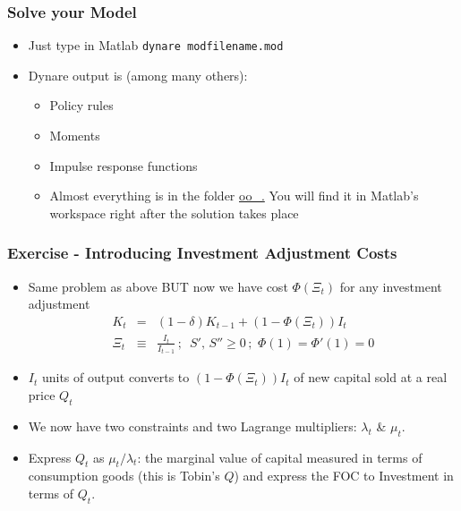 \documentclass[xcolor=dvipsnames,handout,aspectratio=169]{beamer}
\begin{document}
\begin{frame}[t]\frametitle{\textbf{Solve your Model}}
  \begin{itemize}
  \setlength\itemsep{1em}
  \item Just type in Matlab \texttt{dynare modfilename.mod} 
  \item Dynare output is (among many others):
  \begin{itemize}
      \setlength\itemsep{1em}
    \item Policy rules
    \item Moments 
    \item Impulse response functions
    \item Almost everything is in the folder  \url{oo\_.} You will find it in Matlab's workspace right after the solution takes place
  \end{itemize}
 \end{itemize}
\end{frame}

\begin{frame}[t]\frametitle{\textbf{Exercise - Introducing Investment Adjustment Costs}}
  \begin{itemize}
  \setlength\itemsep{1em}
  \item Same problem as above BUT now we have cost $\Phi(\Xi_t)$ for any investment adjustment 
\begin{eqnarray}  \nonumber 
K_{t}&=&(1-\delta) K_{t-1}+(1-\Phi(\Xi_t))I_t\,\\ \nonumber 
\Xi_t&\equiv&\frac{I_t}{I_{t-1}}\,; \,\,\, S',\, S'' \ge
0\,;\,\,\Phi(1)=\Phi'(1)=0 \label{Kaccum1}
 \end{eqnarray}
\item $I_t$ units of output converts to $(1-\Phi(\Xi_t))I_t$ of new capital sold at a real price $Q_t$ 
\item We now have two constraints and two Lagrange multipliers: $\lambda_t$ \& $\mu_t$. 
\item Express $Q_t$ as $\mu_t/\lambda_t$: the marginal value of capital measured in terms of consumption goods (this is Tobin's $Q$) and express the FOC to Investment in terms of $Q_t$.
 \end{itemize}
\end{frame}
\end{document}

